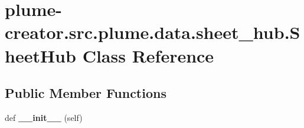 \hypertarget{classplume-creator_1_1src_1_1plume_1_1data_1_1sheet__hub_1_1_sheet_hub}{}\section{plume-\/creator.src.\+plume.\+data.\+sheet\+\_\+hub.\+Sheet\+Hub Class Reference}
\label{classplume-creator_1_1src_1_1plume_1_1data_1_1sheet__hub_1_1_sheet_hub}
\subsection*{Public Member Functions}
\begin{DoxyCompactItemize}
\item 
def {\bfseries \+\_\+\+\_\+init\+\_\+\+\_\+} (self)\hypertarget{classplume-creator_1_1src_1_1plume_1_1data_1_1sheet__hub_1_1_sheet_hub_a9224aac8617eefe0c4d7f58a02844ad2}{}\label{classplume-creator_1_1src_1_1plume_1_1data_1_1sheet__hub_1_1_sheet_hub_a9224aac8617eefe0c4d7f58a02844ad2}

\end{DoxyCompactItemize}
